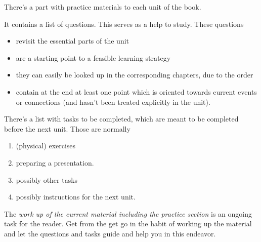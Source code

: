 \documentclass[../main.tex]{subfiles}
\begin{document}
There's a part with practice materials to each unit of the book.\label{InstructionExercises} %

It contains a list of questions. This serves as a help to study. These questions
\begin{itemize}
\item revisit the essential parts of the unit
\item are a starting point to a feasible learning strategy
\item they can easily be looked up in the corresponding chapters, due to the order
\item contain at the end at least one point which is oriented towards current events or connections
  (and hasn't been treated explicitly in the unit).
\end{itemize}

\noindent There's a list with tasks to be completed, which are meant to be completed before the next unit.
Those are normally
\begin{enumerate}[label = \Alph*]
\item (physical) exercises
\item preparing a presentation.
\item possibly other tasks
  \item possibly instructions for the next unit. %
\end{enumerate}


\noindent The \emph{work up of the current material including the practice section} is an ongoing task for the reader.
Get from the get go in the habit of working up the material and let the questions and tasks guide and help you in this endeavor.
\end{document}
